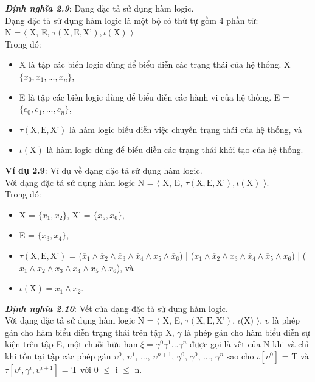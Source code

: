 \documentclass[a4paper,13pt,oneside,openany]{book}
\begin{document}
\begin{flushleft}
		\textbf{\textit{Định nghĩa 2.9}}: Dạng đặc tả sử dụng hàm logic.\\
		Dạng đặc tả sử dụng hàm logic là một bộ có thứ tự gồm 4 phần tử:\\
		N = $\langle$ X, E, $\tau(\textrm{X}, \textrm{E}, \textrm{X'}), \iota(\textrm{X})$ $\rangle$\\
		Trong đó:
		\begin{itemize}
			\item X là tập các biến logic dùng để biểu diễn các trạng thái của hệ thống. X = $\{x_0, x_1, ..., x_n\}$,
			\item E là tập các biến logic dùng để biểu diễn các hành vi của hệ thống. E = $\{e_0, e_1, ..., e_n\}$,
			\item $\tau(\textrm{X}, \textrm{E}, \textrm{X'})$ là hàm logic biểu diễn việc chuyển trạng thái của hệ thống, và
			\item $\iota(\textrm{X})$ là hàm logic dùng để biểu diễn các trạng thái khởi tạo của hệ thống.
		\end{itemize}
		\textbf{Ví dụ 2.9}: Ví dụ về dạng đặc tả sử dụng hàm logic.\\
		Với dạng đặc tả sử dụng hàm logic N = $\langle$ X, E, $\tau(\textrm{X}, \textrm{E}, \textrm{X'}), \iota(\textrm{X})$ $\rangle$.\\
		Trong đó:
		\begin{itemize}
			\item X = $\{x_1, x_2\}$, X' = $\{x_5, x_6\}$,
			\item E = $\{x_3, x_4\}$,
			\item $\tau(\textrm{X}, \textrm{E}, \textrm{X'})$ = ($\overline{x}_1 \land \overline{x}_2 \land \overline{x}_3 \land \overline{x}_4 \land x_5 \land \overline{x}_6$) | ($x_1\land\overline{x}_2\land x_3\land \overline{x}_4\land \overline{x}_5 \land x_6$) |
			($\overline{x}_1\land x_2\land\overline{x}_3\land x_4\land \overline{x}_5\land\overline{x}_6$), và
			\item $\iota(\textrm{X}) = \overline{x}_1 \land \overline{x}_2$.
		\end{itemize}
		\textbf{\textit{Định nghĩa 2.10}}: Vết của dạng đặc tả sử dụng hàm logic.\\
		Với dạng đặc tả sử dụng hàm logic N = $\langle$ X, E, $\tau(\textrm{X}, \textrm{E}, \textrm{X'})$, $\iota$(X) $\rangle$, $\upsilon$ là phép gán cho hàm biểu diễn trạng thái trên tập X, $\gamma$ là phép gán cho hàm biểu diễn sự kiện trên tập E, một chuỗi hữu hạn $\xi = \gamma^0\gamma^1...\gamma^n$ được gọi là vết của N khi và chỉ khi tồn tại tập các phép gán $\upsilon^0$, $\upsilon^1$, ..., $\upsilon^{n+1}$, $\gamma^0$, $\gamma^0$, ..., $\gamma^n$ sao cho $\iota[\upsilon^0]$ = T và $\tau[\upsilon^i, \gamma^i, \upsilon^{i+1}]$ = T với 0 $\leq$ i $\leq$ n.\\

\end{flushleft}
\end{document}

